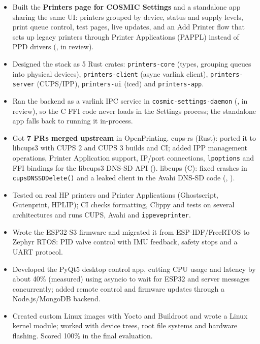 \documentclass[10pt]{article}
\begin{document}
\begin{itemize}
  \item Built the \textbf{Printers page for COSMIC Settings} and a standalone app sharing the same UI: printers grouped by device, status and supply levels, print queue control, test pages, live updates, and an Add Printer flow that sets up legacy printers through Printer Applications (PAPPL) instead of PPD drivers (, in review).
  \item Designed the stack as 5 Rust crates: \texttt{printers-core} (types, grouping queues into physical devices), \texttt{printers-client} (async varlink client), \texttt{printers-server} (CUPS/IPP), \texttt{printers-ui} (iced) and \texttt{printers-app}.
  \item Ran the backend as a varlink IPC service in \texttt{cosmic-settings-daemon} (, in review), so the C FFI code never loads in the Settings process; the standalone app falls back to running it in-process.
  \item Got \textbf{7 PRs merged upstream} in OpenPrinting. cups-rs (Rust): ported it to libcups3 with CUPS 2 and CUPS 3 builds and CI; added IPP management operations, Printer Application support, IP/port connections, \texttt{lpoptions} and FFI bindings for the libcups3 DNS-SD API (). libcups (C): fixed crashes in \texttt{cupsDNSSDDelete()} and a leaked client in the Avahi DNS-SD code (, ).
  \item Tested on real HP printers and Printer Applications (Ghostscript, Gutenprint, HPLIP); CI checks formatting, Clippy and tests on several architectures and runs CUPS, Avahi and \texttt{ippeveprinter}.
\end{itemize}
\begin{itemize}
  \item Wrote the ESP32-S3 firmware and migrated it from ESP-IDF/FreeRTOS to Zephyr RTOS: PID valve control with IMU feedback, safety stops and a UART protocol.
  \item Developed the PyQt5 desktop control app, cutting CPU usage and latency by about 40\% (measured) using asyncio to wait for ESP32 and server messages concurrently; added remote control and firmware updates through a Node.js/MongoDB backend.
\end{itemize}
\begin{itemize}
  \item Created custom Linux images with Yocto and Buildroot and wrote a Linux kernel module; worked with device trees, root file systems and hardware flashing. Scored 100\% in the final evaluation.
\end{itemize}
\end{document}
